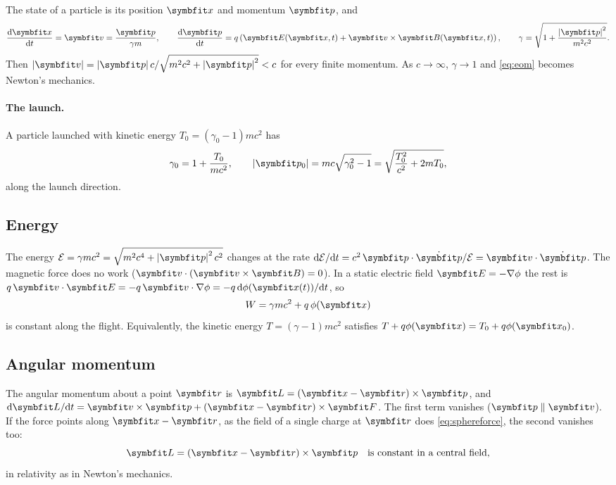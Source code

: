 \documentclass{leveldoc}
\begin{document}
The state of a particle is its position $\vect{x}$ and momentum $\vect{p}$, and
\begin{equation}\label{eq:eom}
  \deriv{\vect{x}}{t} = \vect{v} = \frac{\vect{p}}{\gamma m}, \qquad
  \deriv{\vect{p}}{t} = q\left(\vect{E}(\vect{x},t) + \vect{v}\times\vect{B}(\vect{x},t)\right), \qquad
  \gamma = \sqrt{1 + \frac{\abs{\vect{p}}^2}{m^2c^2}}.
\end{equation}
Then $\abs{\vect{v}} = \abs{\vect{p}}c/\sqrt{m^2c^2+\abs{\vect{p}}^2} < c$ for every finite
momentum. As $c\to\infty$, $\gamma\to 1$ and \eqref{eq:eom} becomes Newton's mechanics.

\paragraph{The launch.} A particle launched with kinetic energy
$T_0 = (\gamma_0-1)mc^2$ has
\begin{equation}\label{eq:launch}
  \gamma_0 = 1 + \frac{T_0}{mc^2}, \qquad
  \abs{\vect{p}_0} = mc\sqrt{\gamma_0^2-1} = \sqrt{\frac{T_0^2}{c^2} + 2mT_0},
\end{equation}
along the launch direction.

\subsection{Energy}\label{sec:energy}

The energy $\mathcal{E} = \gamma mc^2 = \sqrt{m^2c^4 + \abs{\vect{p}}^2c^2}$ changes at the
rate $\dd\mathcal{E}/\dd t = c^2\,\vect{p}\cdot\dot{\vect{p}}/\mathcal{E} = \vect{v}\cdot\dot{\vect{p}}$.
The magnetic force does no work ($\vect{v}\cdot(\vect{v}\times\vect{B}) = 0$). In a static
electric field $\vect{E} = -\nabla\phi$ the rest is
$q\,\vect{v}\cdot\vect{E} = -q\,\vect{v}\cdot\nabla\phi = -q\,\dd\phi(\vect{x}(t))/\dd t$, so
\begin{equation}\label{eq:energy}
  W = \gamma mc^2 + q\,\phi(\vect{x})
\end{equation}
is constant along the flight. Equivalently, the kinetic energy $T = (\gamma-1)mc^2$ satisfies
$T + q\phi(\vect{x}) = T_0 + q\phi(\vect{x}_0)$.

\subsection{Angular momentum}\label{sec:angmom}

The angular momentum about a point $\vect{r}$ is
$\vect{L} = (\vect{x}-\vect{r})\times\vect{p}$, and
$\dd\vect{L}/\dd t = \vect{v}\times\vect{p} + (\vect{x}-\vect{r})\times\vect{F}$. The first term
vanishes ($\vect{p}\parallel\vect{v}$). If the force points along $\vect{x}-\vect{r}$, as the
field of a single charge at $\vect{r}$ does \eqref{eq:sphereforce}, the second vanishes too:
\begin{equation}\label{eq:angmom}
  \vect{L} = (\vect{x}-\vect{r})\times\vect{p} \quad\text{is constant in a central field,}
\end{equation}
in relativity as in Newton's mechanics.
\end{document}
